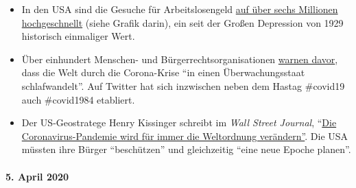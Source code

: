 \begin{itemize}
{  ein Drittel der Menschheit} in einem ``Lockdown'', das sind mehr
  Menschen als zur Zeit des Zweiten Weltkriegs lebten.
\item
  In den USA sind die Gesuche für Arbeitslosengeld
  \href{https://www.reuters.com/article/us-health-coronavirus-usa-layoffs/us-weekly-jobless-claims-seen-at-record-high-again-idUSKBN21K0FX}{auf
  über sechs Millionen hochgeschnellt} (siehe Grafik darin), ein seit
  der Großen Depression von 1929 historisch einmaliger Wert.
\item
  Über einhundert Menschen- und Bürger­rechts­organisationen
  \href{https://www.dailymail.co.uk/news/article-8181381/World-sleepwalking-surveillance-state-rights-groups-warn.html}{warnen
  davor}, dass die Welt durch die Corona-Krise ``in einen
  Über­wachungs­staat schlafwandelt''. Auf Twitter hat sich inzwischen
  neben dem Hastag \#covid19 auch \#covid1984 etabliert.
\item
  Der US-Geostratege Henry Kissinger schreibt im \emph{Wall Street
  Journal},
  ``\href{https://www.wsj.com/articles/the-coronavirus-pandemic-will-forever-alter-the-world-order-11585953005}{Die
  Coronavirus-Pandemie wird für immer die Weltordnung verändern''}. Die
  USA müssten ihre Bürger ``beschützen'' und gleichzeitig ``eine neue
  Epoche planen''.
\end{itemize}

\hypertarget{5-april-2020}{%
\paragraph{5. April 2020}\label{5-april-2020}}

